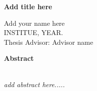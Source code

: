 
\begin{center}
  {\large \textbf{Add title here}}
  \vspace*{1em}
  
Add your name here \\
INSTITUE, YEAR.\\
  \vspace*{1em}
 Thesis Advisor: Advisor name\\
  \vspace*{1em}
\end{center}
\begin{center}
{\large \textbf{Abstract}}\end{center}
\\

\emph{add abstract here.....}
